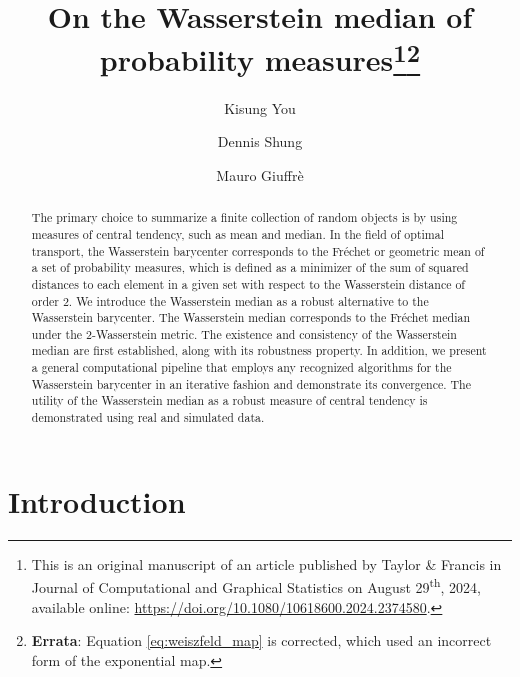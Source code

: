 \documentclass[11pt]{article}
\newcommand{\Frechet}{Fr\'{e}chet }
\begin{document}
	
\title{On the Wasserstein median of probability measures\footnote{This is an original manuscript of an article published by Taylor \& Francis in Journal of Computational and Graphical Statistics on August 29\textsuperscript{th}, 2024, available online: \url{https://doi.org/10.1080/10618600.2024.2374580}.
}\footnote{{\color{red} \textbf{Errata}}: Equation \eqref{eq:weiszfeld_map} is corrected, which used an incorrect form of the exponential map.}}
\author[1]{Kisung You}
\author[2]{Dennis Shung}
\author[2]{Mauro Giuffr\`{e}}

\date{}

\maketitle
\begin{abstract}
The primary choice to summarize a finite collection of random objects is by using measures of central tendency, such as mean and median.
In the field of optimal transport, the Wasserstein barycenter corresponds to the \Frechet or geometric mean of a set of probability measures, which is defined as a minimizer of the sum of squared distances to each element in a given set with respect to the Wasserstein distance of order 2.
We introduce the Wasserstein median as a robust alternative to the Wasserstein barycenter. The Wasserstein median corresponds to the \Frechet median under the 2-Wasserstein metric.
The existence and consistency of the Wasserstein median are first established, along with its robustness property. 
In addition, we present a general computational pipeline that employs any recognized algorithms for the Wasserstein barycenter in an iterative fashion and demonstrate its convergence.
The utility of the Wasserstein median as a robust measure of central tendency is  demonstrated using real and simulated data. 
\end{abstract}


\section{Introduction}\label{sec:intro}
\end{document}
